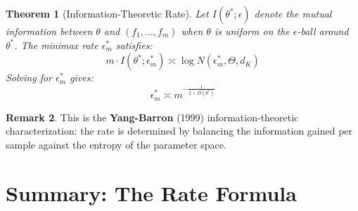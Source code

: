 \documentclass[11pt]{article}
\newtheorem{theorem}{Theorem}[section]
\theoremstyle{definition}
\newtheorem{remark}[theorem]{Remark}
\begin{document}
\begin{theorem}[Information-Theoretic Rate]
\label{thm:info}
Let $I(\theta^*; \epsilon)$ denote the mutual information between $\theta$ and $(f_1, \ldots, f_m)$ when $\theta$ is uniform on the $\epsilon$-ball around $\theta^*$. The minimax rate $\epsilon_m^*$ satisfies:
\begin{equation}
    m \cdot I(\theta^*; \epsilon_m^*) \asymp \log N(\epsilon_m^*, \Theta, d_K)
\end{equation}
Solving for $\epsilon_m^*$ gives:
\begin{equation}
    \epsilon_m^* \asymp m^{-\frac{1}{2 + D(\theta^*)}}
\end{equation}
\end{theorem}

\begin{remark}
This is the \textbf{Yang-Barron} (1999) information-theoretic characterization: the rate is determined by balancing the information gained per sample against the entropy of the parameter space.
\end{remark}

\section{Summary: The Rate Formula}
\end{document}
